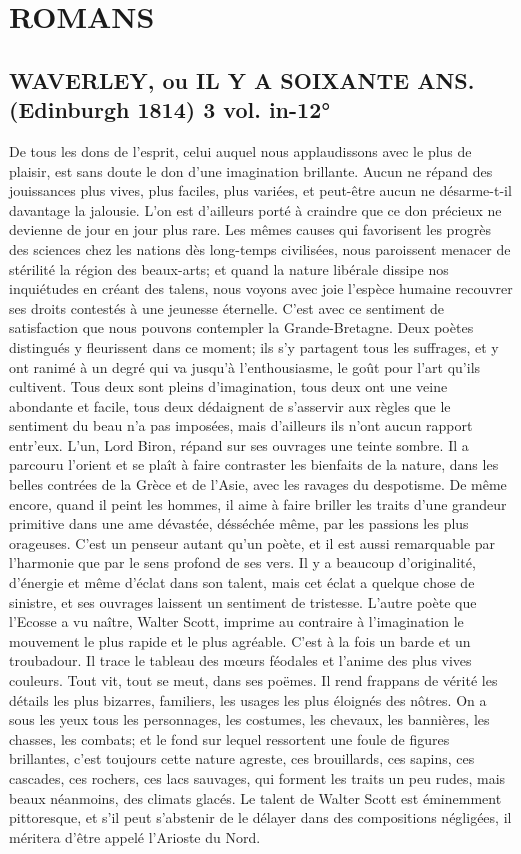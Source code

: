 \setcounter{page}{532}
\chapter{ROMANS}
\section{WAVERLEY, ou IL Y A SOIXANTE ANS. (Edinburgh 1814) 3 vol. in-12°}
De tous les dons de l'esprit, celui auquel nous applaudissons avec le plus de plaisir, est sans doute le don d'une imagination brillante. Aucun ne répand des jouissances plus vives, plus faciles, plus variées, et peut-être aucun ne désarme-t-il davantage la jalousie. L'on est d'ailleurs porté à craindre que ce don précieux ne devienne de jour en jour plus rare. Les mêmes causes qui favorisent les progrès des sciences chez les nations dès long-temps civilisées, nous paroissent menacer de stérilité la région des beaux-arts; et quand la nature libérale dissipe nos inquiétudes en créant des talens, nous voyons avec joie l'espèce humaine recouvrer ses droits contestés à une jeunesse éternelle.
C'est avec ce sentiment de satisfaction que nous pouvons contempler la Grande-Bretagne. Deux poètes distingués y fleurissent dans ce moment; ils s'y partagent tous les suffrages,\setcounter{page}{533} et y ont ranimé à un degré qui va jusqu'à l'enthousiasme, le goût pour l'art qu'ils cultivent. Tous deux sont pleins d'imagination, tous deux ont une veine abondante et facile, tous deux dédaignent de s'asservir aux règles que le sentiment du beau n'a pas imposées, mais d'ailleurs ils n'ont aucun rapport entr'eux. L'un, Lord Biron, répand sur ses ouvrages une teinte sombre. Il a parcouru l'orient et se plaît à faire contraster les bienfaits de la nature, dans les belles contrées de la Grèce et de l'Asie, avec les ravages du despotisme. De même encore, quand il peint les hommes, il aime à faire briller les traits d'une grandeur primitive dans une ame dévastée, désséchée même, par les passions les plus orageuses. C'est un penseur autant qu'un poète, et il est aussi remarquable par l'harmonie que par le sens profond de ses vers. Il y a beaucoup d'originalité, d'énergie et même d'éclat dans son talent, mais cet éclat a quelque chose de sinistre, et ses ouvrages laissent un sentiment de tristesse. L'autre poète que l'Ecosse a vu naître, Walter Scott, imprime au contraire à l'imagination le mouvement le plus rapide et le plus agréable. C'est à la fois un barde et un troubadour. Il trace le tableau des mœurs féodales et l'anime des plus vives couleurs. Tout vit,\setcounter{page}{534} tout se meut, dans ses poëmes. Il rend frappans de vérité les détails les plus bizarres, familiers, les usages les plus éloignés des nôtres. On a sous les yeux tous les personnages, les costumes, les chevaux, les bannières, les chasses, les combats; et le fond sur lequel ressortent une foule de figures brillantes, c'est toujours cette nature agreste, ces brouillards, ces sapins, ces cascades, ces rochers, ces lacs sauvages, qui forment les traits un peu rudes, mais beaux néanmoins, des climats glacés. Le talent de Walter Scott est éminemment pittoresque, et s'il peut s'abstenir de le délayer dans des compositions négligées, il méritera d'être appelé l'Arioste du Nord.
